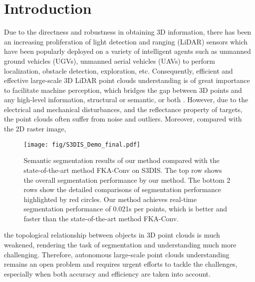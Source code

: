 \documentclass[journal]{IEEEtran}
\begin{document}
\section{Introduction}
\IEEEPARstart 
{D}{ue} to the directness and robustness in obtaining 3D information, there has been an increasing proliferation of light detection and ranging (LiDAR) sensors which have been popularly deployed on a variety of intelligent agents such as unmanned ground vehicles (UGVs), unmanned aerial vehicles (UAVs) to perform localization, obstacle detection, exploration, etc. Consequently, efficient and effective large-scale 3D LiDAR point clouds understanding is of great importance to facilitate machine perception, which bridges the gap between 3D points and any high-level information, structural or semantic, or both \cite{wang2019re,cong2018speedup, zhang2019shellnet,guo20143d}. However, due to the electrical and mechanical disturbances, and the reflectance property of targets, the point clouds often suffer from noise and outliers. Moreover, compared with the 2D raster image,
\begin{figure}[htbp!]
\centering
\texttt{[image: fig/S3DIS\_Demo\_final.pdf]}
\caption{Semantic segmentation results of our method compared with the state-of-the-art method FKA-Conv\cite{boulch2020fka} on S3DIS\cite{armeni20163d}. The top row shows the overall segmentation performance by our method. The bottom 2 rows show the detailed comparisons of segmentation performance highlighted by red circles. Our method achieves real-time segmentation performance of 0.021s per  points, which is better and faster than the state-of-the-art method FKA-Conv.}
\label{fig_demo}
\vspace{-0.38cm}
\end{figure}
the topological relationship between objects in 3D point clouds is much weakened, rendering the task of segmentation and understanding much more challenging. Therefore, autonomous large-scale point clouds understanding remains an open problem and requires urgent efforts to tackle the challenges, especially when both accuracy and efficiency are taken into account.   
\end{document}
